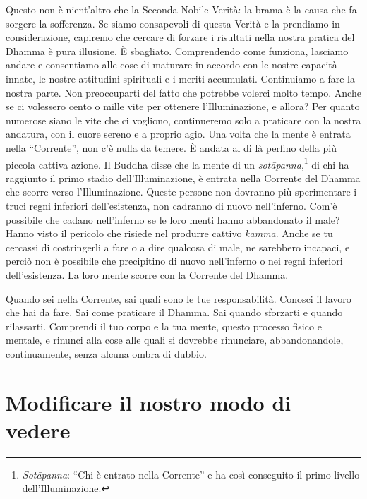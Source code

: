 Questo non è nient'altro che la Seconda Nobile Verità: la brama è la
causa che fa sorgere la sofferenza. Se siamo consapevoli di questa
Verità e la prendiamo in considerazione, capiremo che cercare di forzare
i risultati nella nostra pratica del Dhamma è pura illusione. È
sbagliato. Comprendendo come funziona, lasciamo andare e consentiamo
alle cose di maturare in accordo con le nostre capacità innate, le
nostre attitudini spirituali e i meriti accumulati. Continuiamo a fare
la nostra parte. Non preoccuparti del fatto che potrebbe volerci molto
tempo. Anche se ci volessero cento o mille vite per ottenere
l'Illuminazione, e allora? Per quanto numerose siano le vite che ci
vogliono, continueremo solo a praticare con la nostra andatura, con il
cuore sereno e a proprio agio. Una volta che la mente è entrata nella
``Corrente'', non c'è nulla da temere. È andata al di là perfino della
più piccola cattiva azione. Il Buddha disse che la mente di un
\emph{sotāpanna},\footnote{\emph{Sotāpanna}: ``Chi è entrato nella
  Corrente'' e ha così conseguito il primo livello dell'Illuminazione.}
di chi ha raggiunto il primo stadio dell'Illuminazione, è entrata nella
Corrente del Dhamma che scorre verso l'Illuminazione. Queste persone non
dovranno più sperimentare i truci regni inferiori dell'esistenza, non
cadranno di nuovo nell'inferno. Com'è possibile che cadano nell'inferno
se le loro menti hanno abbandonato il male? Hanno visto il pericolo che
risiede nel produrre cattivo \emph{kamma}. Anche se tu cercassi di
costringerli a fare o a dire qualcosa di male, ne sarebbero incapaci, e
perciò non è possibile che precipitino di nuovo nell'inferno o nei
regni inferiori dell'esistenza. La loro mente scorre con la Corrente del
Dhamma.

Quando sei nella Corrente, sai quali sono le tue responsabilità. Conosci
il lavoro che hai da fare. Sai come praticare il Dhamma. Sai quando
sforzarti e quando rilassarti. Comprendi il tuo corpo e la tua mente,
questo processo fisico e mentale, e rinunci alla cose alle quali si
dovrebbe rinunciare, abbandonandole, continuamente, senza alcuna ombra
di dubbio.

\section{Modificare il nostro modo di vedere}

